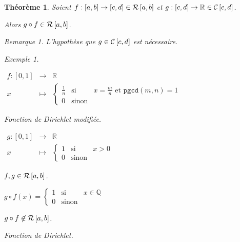 \documentclass{report}
\newcommand*{\reels}{\mathbb{R}}
\newcommand*{\rationels}{\mathbb{Q}}
\newtheorem*{thm}{Th\'eor\`eme}
\theoremstyle{definition}
\theoremstyle{remark}
\newtheorem*{exem}{Exemple}
\newtheorem*{rema}{Remarque}
\begin{document}
	\begin{thm}
		Soient $f:[a,b] \to [c,d] \in \riemann$ et $g:[c,d] \to \reels \in \continue[c,d]$.

		Alors $g \circ f \in \riemann$.

		\begin{rema}
			L'hypoth\`ese que $g \in \continue[c,d]$ est n\'ecessaire.

			\begin{exem}
				~

				$
				\begin{array}{rcl}
					f:[0,1]&\to&\reels\\
					x&\mapsto&\left\lbrace \begin{array}{lcl}
						\frac{1}{n}&\text{si}&x=\frac{m}{n} \text{ et } \mathtt{pgcd}(m,n)=1\\
						0&\text{sinon}
					\end{array}\right.
				\end{array}$

				Fonction de Dirichlet modifi\'ee.

				$
				\begin{array}{rcl}
					g:[0,1]&\to&\reels\\
					x&\mapsto&\left\lbrace \begin{array}{lcl}
						1&\text{si}&x>0\\
						0&\text{sinon}
					\end{array}\right.
				\end{array}$

				$f,g \in \riemann$.

				$g \circ f(x)=\left\lbrace \begin{array}{lcl}
					1&\text{si}&x \in \rationels\\
					0&\text{sinon}
				\end{array}\right.$

				$g \circ f \not\in \riemann$.

				Fonction de Dirichlet.
			\end{exem}
		\end{rema}
	\end{thm}
\end{document}
